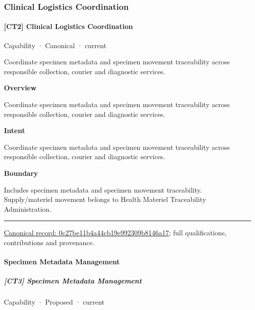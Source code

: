 \subsubsection{Clinical Logistics Coordination}

\paragraph{[CT2] Clinical Logistics Coordination}

\label{element:0c27be11b4a44cb19e992309b8146a17}
{\small Capability · Canonical · current}\par

Coordinate specimen metadata and specimen movement traceability across responsible collection, courier and diagnostic services.



\textbf{Overview}



Coordinate specimen metadata and specimen movement traceability across responsible collection, courier and diagnostic services.



\textbf{Intent}



Coordinate specimen metadata and specimen movement traceability across responsible collection, courier and diagnostic services.



\textbf{Boundary}



Includes specimen metadata and specimen movement traceability. Supply/materiel movement belongs to Health Materiel Traceability Administration.



\medskip\hrule\medskip

{\footnotesize \href{../../../../continuum/strategy/capability/0c27be11b4a44cb19e992309b8146a17.md}{Canonical record: 0c27be11b4a44cb19e992309b8146a17}; full qualifications, contributions and provenance.}\par
\paragraph{Specimen Metadata Management}

\subparagraph{[CT3] Specimen Metadata Management}

\label{element:738736425b7446fdae47b06c91c4f69c}
{\small Capability · Proposed · current}\par

